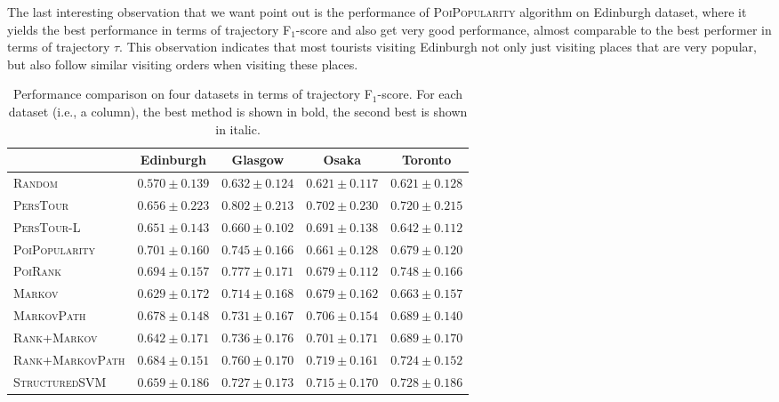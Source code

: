 % 
The last interesting observation that we want point out is the performance of \textsc{PoiPopularity} algorithm
on Edinburgh dataset, where it yields the best performance in terms of trajectory F$_1$-score and 
also get very good performance, almost comparable to the best performer in terms of trajectory $\tau$.
This observation indicates that most tourists visiting Edinburgh not only just visiting
places that are very popular, but also follow similar visiting orders when visiting these places.


\begin{table*}
\centering
\begin{tabular}{l|cccc} \hline
 & Edinburgh & Glasgow & Osaka & Toronto \\ \hline
\textsc{Random} & $0.570\pm0.139$ & $0.632\pm0.124$ & $0.621\pm0.117$ & $0.621\pm0.128$ \\
\textsc{PersTour}\cite{ijcai15} & $0.656\pm0.223$ & $\mathbf{0.802\pm0.213}$ & $0.702\pm0.230$ & $0.720\pm0.215$ \\
\textsc{PersTour-L} & $0.651\pm0.143$ & $0.660\pm0.102$ & $0.691\pm0.138$ & $0.642\pm0.112$ \\
\textsc{PoiPopularity} & $\mathbf{0.701\pm0.160}$ & $0.745\pm0.166$ & $0.661\pm0.128$ & $0.679\pm0.120$ \\
\textsc{PoiRank} & $\mathit{0.694\pm0.157}$ & $\mathit{0.777\pm0.171}$ & $0.679\pm0.112$ & $\mathbf{0.748\pm0.166}$ \\
\textsc{Markov} & $0.629\pm0.172$ & $0.714\pm0.168$ & $0.679\pm0.162$ & $0.663\pm0.157$ \\
\textsc{MarkovPath} & $0.678\pm0.148$ & $0.731\pm0.167$ & $0.706\pm0.154$ & $0.689\pm0.140$ \\
\textsc{Rank+Markov} & $0.642\pm0.171$ & $0.736\pm0.176$ & $0.701\pm0.171$ & $0.689\pm0.170$ \\
\textsc{Rank+MarkovPath} & $0.684\pm0.151$ & $0.760\pm0.170$ & $\mathbf{0.719\pm0.161}$ & $0.724\pm0.152$ \\
\textsc{StructuredSVM} & $0.659\pm0.186$ & $0.727\pm0.173$ & $\mathit{0.715\pm0.170}$ & $\mathit{0.728\pm0.186}$ \\
\hline
\end{tabular}
\caption{Performance comparison on four datasets in terms of trajectory F$_1$-score. 
         For each dataset (i.e., a column), the best method is shown in bold, the second best is shown in italic.}
\label{table:f1}
\end{table*}


